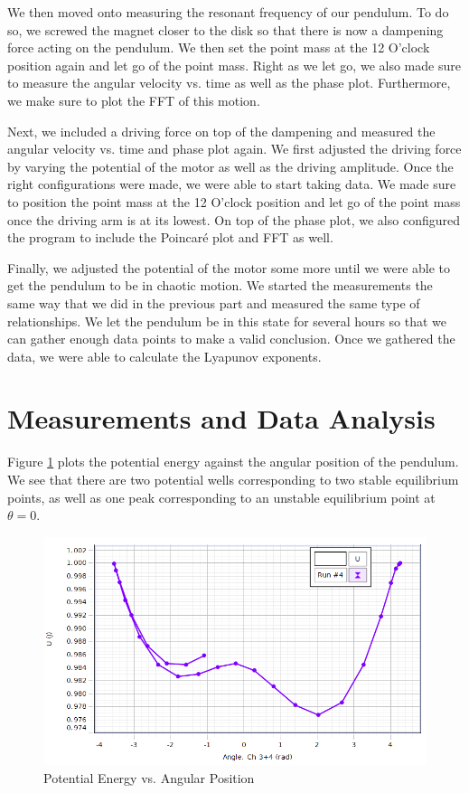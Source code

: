 \documentclass[twocolumn,amsmath,amssymb,pra, floatfix]{revtex4-2}
\begin{document}
We then moved onto measuring the resonant frequency of our pendulum. To do so, we screwed the magnet closer to the disk so that there is now a dampening force acting on the pendulum. We then set the point mass at the 12 O'clock position again and let go of the point mass. Right as we let go, we also made sure to measure the angular velocity vs. time as well as the phase plot. Furthermore, we make sure to plot the FFT of this motion.

Next, we included a driving force on top of the dampening and measured the angular velocity vs. time and phase plot again. We first adjusted the driving force by varying the potential of the motor as well as the driving amplitude. Once the right configurations were made, we were able to start taking data. We made sure to position the point mass at the 12 O'clock position and let go 
of the point mass once the driving arm is at its lowest. On top of the phase plot, we also configured the
program to include the Poincar\'{e} plot and FFT as well. 

Finally, we adjusted the potential of the motor some more until we were able to get the pendulum to be in chaotic motion. We started the measurements the same way that we did in the previous part and measured the same type of relationships. We let the pendulum be in this state for several hours so that we can gather enough data points to make a valid conclusion. Once we gathered the data, we were able to calculate the Lyapunov exponents.

\section{Measurements and Data Analysis}
Figure \ref{fig: Potential Energy Plot} plots the potential energy against the angular position of the pendulum. We see that there are two potential wells corresponding to two stable equilibrium points, as well as one peak corresponding to an unstable equilibrium point at $\theta = 0$. 

\begin{figure}[H]
    \centering
    \includegraphics[width = 0.7\linewidth]{images/PotentialWell.PNG}
    \caption{Potential Energy vs. Angular Position}
    \label{fig: Potential Energy Plot}
\end{figure}
\end{document}
